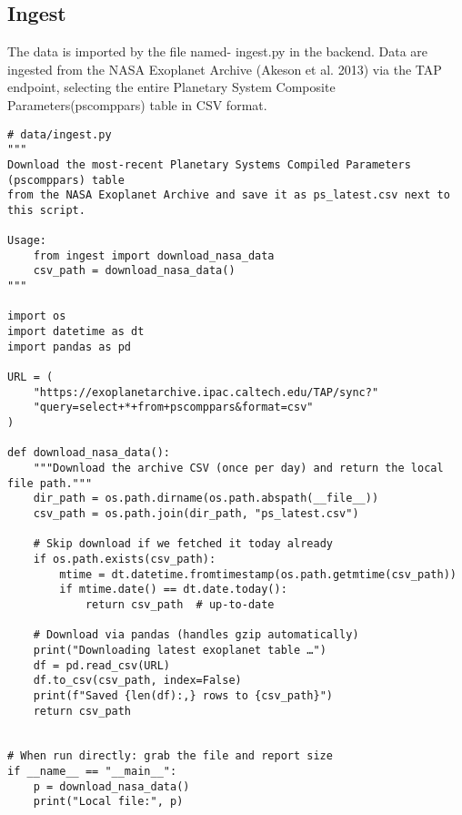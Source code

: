 \documentclass[12pt]{article}
\begin{document}
\subsection{Ingest}\label{subsec:input}
The data is imported by the file named- ingest.py in the backend. Data are ingested from the NASA Exoplanet Archive (Akeson et al. 2013) via the TAP endpoint, selecting the entire Planetary System Composite Parameters(pscomppars) table in CSV format.
\begin{verbatim}
# data/ingest.py
"""
Download the most-recent Planetary Systems Compiled Parameters (pscomppars) table
from the NASA Exoplanet Archive and save it as ps_latest.csv next to this script.

Usage:
    from ingest import download_nasa_data
    csv_path = download_nasa_data()
"""

import os
import datetime as dt
import pandas as pd

URL = (
    "https://exoplanetarchive.ipac.caltech.edu/TAP/sync?"
    "query=select+*+from+pscomppars&format=csv"
)

def download_nasa_data():
    """Download the archive CSV (once per day) and return the local file path."""
    dir_path = os.path.dirname(os.path.abspath(__file__))
    csv_path = os.path.join(dir_path, "ps_latest.csv")

    # Skip download if we fetched it today already
    if os.path.exists(csv_path):
        mtime = dt.datetime.fromtimestamp(os.path.getmtime(csv_path))
        if mtime.date() == dt.date.today():
            return csv_path  # up-to-date

    # Download via pandas (handles gzip automatically)
    print("Downloading latest exoplanet table …")
    df = pd.read_csv(URL)
    df.to_csv(csv_path, index=False)
    print(f"Saved {len(df):,} rows to {csv_path}")
    return csv_path


# When run directly: grab the file and report size
if __name__ == "__main__":
    p = download_nasa_data()
    print("Local file:", p)
\end{verbatim}\vspace{2em}
\end{document}
